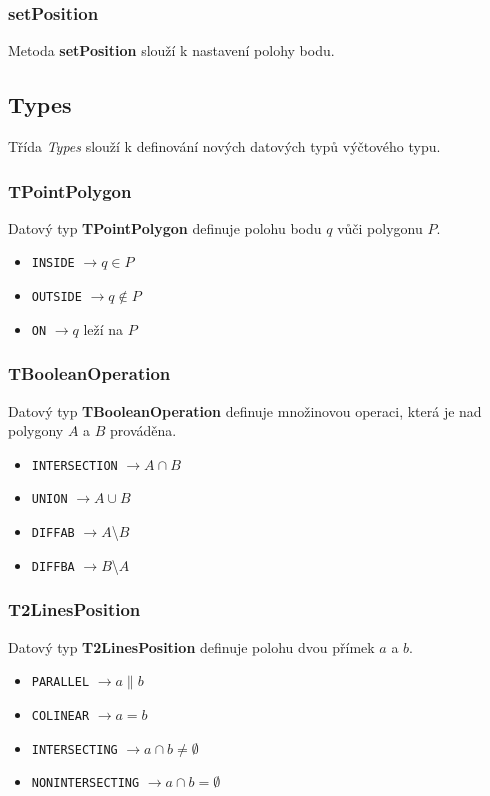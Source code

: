 \documentclass[a4paper, 12pt]{article}
\begin{document}
\subsubsection*{setPosition}
Metoda \textbf{setPosition} slouží k nastavení polohy bodu. 


\subsection{Types}
Třída \textit{Types} slouží k definování nových datových typů výčtového typu.

\subsubsection*{TPointPolygon}
Datový typ \textbf{TPointPolygon} definuje polohu bodu $q$ vůči polygonu $P$.\\ 
\begin{itemize}
\item \texttt{INSIDE} $\rightarrow q \in P$
\item \texttt{OUTSIDE} $\rightarrow q \notin P$
\item \texttt{ON} $\rightarrow q$ leží na $P$
\end{itemize}

\subsubsection*{TBooleanOperation}
Datový typ \textbf{TBooleanOperation} definuje množinovou operaci, která je nad polygony $A$ a $B$ prováděna.\\ 
\begin{itemize}
\item \texttt{INTERSECTION} $\rightarrow A \cap B$ 
\item \texttt{UNION} $\rightarrow A \cup B$
\item \texttt{DIFFAB} $\rightarrow A$\textbackslash $B$
\item \texttt{DIFFBA} $\rightarrow B$\textbackslash $A$
\end{itemize}

\subsubsection*{T2LinesPosition}
Datový typ \textbf{T2LinesPosition} definuje polohu dvou přímek $a$ a $b$.\\  
\begin{itemize}
\item \texttt{PARALLEL} $\rightarrow a \parallel b$
\item \texttt{COLINEAR} $\rightarrow a = b$
\item \texttt{INTERSECTING} $\rightarrow a \cap b \neq \emptyset$
\item \texttt{NONINTERSECTING} $\rightarrow a \cap b = \emptyset$
\end{itemize}
\end{document}

